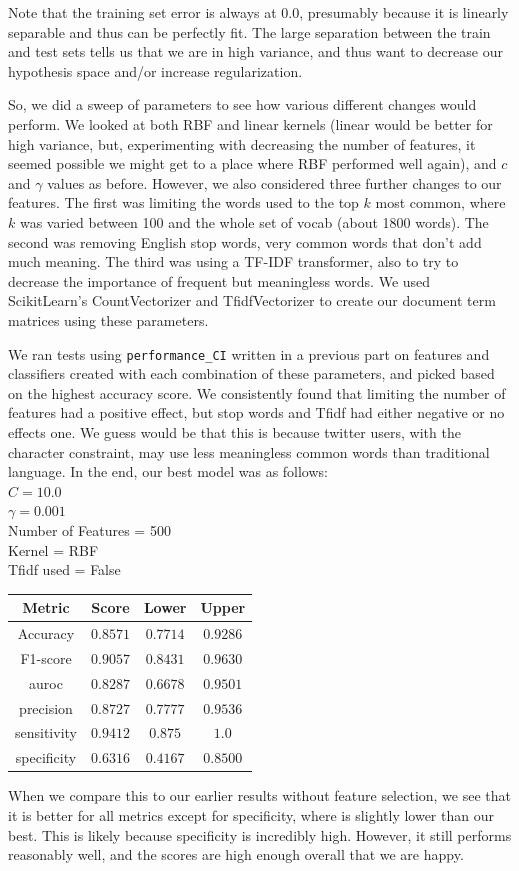 \documentclass[11pt]{article}
\begin{document}
\begin{enumerate}
Note that the training set error is always at 0.0, presumably because it is linearly separable and thus can be 
perfectly fit. The large separation between the train and test sets tells us that we are in high variance, and 
thus want to decrease our hypothesis space and/or increase regularization.

So, we did a sweep of parameters to see how various different changes would perform. We looked at 
both RBF and linear kernels (linear would be better for high variance, but, experimenting with decreasing the number of features, it seemed possible we might get to a place where RBF performed well again), and $c$
and $\gamma$ values as before. However, we also considered three further changes to our features. The 
first was limiting the words used to the top $k$ most common, where $k$ was varied between 100 and the whole
set of vocab (about 1800 words). The second was removing English stop words, very common words that don't add much meaning. The third was using a TF-IDF transformer, also to try to decrease the importance of frequent but meaningless words. We used ScikitLearn's CountVectorizer and TfidfVectorizer to create our document term matrices using these parameters. 

We ran tests using \texttt{performance\_CI} written in a previous part on features and classifiers created with each combination of these parameters, and picked based on the highest accuracy score. We consistently found that limiting the number of features had a positive effect, but stop words and Tfidf had either negative or no effects one. We guess would be that this is because twitter users, with the character constraint, may use less meaningless common words than traditional language. In the end, our best model was as follows:
\\$C=10.0$
\\$\gamma = 0.001$
\\Number of Features = 500
\\Kernel = RBF
\\ Tfidf used = False

\begin{tabular}{| c | c | c | c |}
\hline
Metric & Score & Lower & Upper \\
\hline
Accuracy & $0.8571$ & $0.7714$ & $0.9286$ \\
F1-score & $0.9057$ & $0.8431$ & $0.9630$ \\
auroc & $0.8287$ & $0.6678$ & $0.9501$ \\
precision & $0.8727$ & $0.7777$ & $0.9536$ \\
sensitivity & $0.9412$ & $0.875$ & $1.0$ \\
specificity & $0.6316$ & $0.4167$ & $0.8500$ \\
\hline
\end{tabular}

When we compare this to our earlier results without feature selection, we see that it is better for all metrics
except for specificity, where is slightly lower than our best. This is likely because specificity is incredibly high. However, it still performs reasonably well, and the scores are high enough overall that we are happy. 

\end{enumerate}
\end{document}
